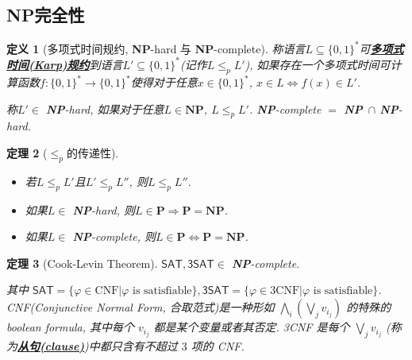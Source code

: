 \documentclass[8pt]{article}
\theoremstyle{compact}
\newtheorem{theorem}{定理}[section]
\newtheorem{definition}[theorem]{定义}
\def\obj#1{\textbf{\uline{#1}}}
\def\le{\leqslant}
\def\P{\textbf{P}}
\def\NP{\textbf{NP}}
\begin{document}
\subsection{\NP 完全性}
\begin{definition}[多项式时间规约, \NP-hard 与 \NP-complete]
	称语言$L \subseteq \{0, 1\}^*$可\obj{多项式时间(Karp)规约}到语言$L' \subseteq \{0, 1\}^*$(记作$L \le_p L'$), 如果存在一个多项式时间可计算函数$f: \{0, 1\}^* \to \{0, 1\}^*$使得对于任意$x \in \{0, 1\}^*$, $x \in L \Leftrightarrow f(x) \in L'$. 

	称$L' \in $ \NP-hard, 如果对于任意$L \in \NP$, $L \le_p L'$. \NP-complete $=$ \NP\ $\cap$ \NP-hard.  
\end{definition}
\begin{theorem}[$\le_p$的传递性]
	\begin{itemize}
		\item 若$L \le_p L'$且$L' \le_p L''$, 则$L \le_p L''$. 
		\item 如果$L \in $ \NP-hard, 则$L \in \P \Rightarrow \P = \NP$. 
		\item 如果$L \in $ \NP-complete, 则$L \in \P \Leftrightarrow \P = \NP$. 
	\end{itemize}
\end{theorem}
\begin{theorem}[Cook-Levin Theorem]
	$\textsf{SAT}, \textsf{3SAT} \in $ \NP-complete. 

	其中 $\textsf{SAT} = \{\varphi \in \text{CNF} | \varphi \text{ is satisfiable}\}, \textsf{3SAT} = \{\varphi \in 3\text{CNF} | \varphi \text{ is satisfiable}\}$. CNF(Conjunctive Normal Form, 合取范式)是一种形如 $\bigwedge_i\left(\bigvee_j v_{i_j}\right)$ 的特殊的 boolean formula, 其中每个 $v_{i_j}$ 都是某个变量或者其否定. 3CNF 是每个 $\bigvee_j v_{i_j}$ (称为\obj{从句(clause)})中都只含有不超过 $3$ 项的 CNF.
\end{theorem}
\end{document}
